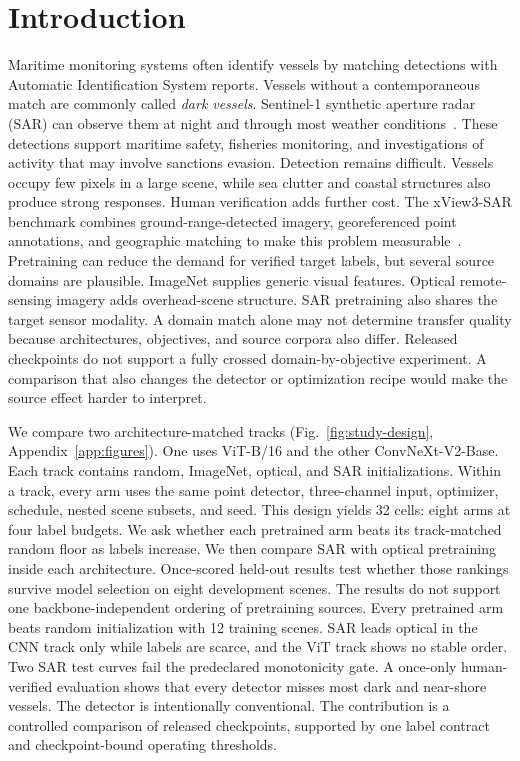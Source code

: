 \section{Introduction}

Maritime monitoring systems often identify vessels by matching detections
with Automatic Identification System reports. Vessels without a
contemporaneous match are commonly called \emph{dark vessels}. Sentinel-1
synthetic aperture radar (SAR) can observe them at night and through most
weather conditions~\cite{torres2012sentinel1}. These detections support
maritime safety, fisheries monitoring, and investigations of activity that
may involve sanctions evasion. Detection remains difficult. Vessels occupy
few pixels in a large scene, while sea clutter and coastal structures also
produce strong responses. Human verification adds further cost. The
xView3-SAR benchmark combines ground-range-detected imagery, georeferenced
point annotations, and geographic matching to make this problem
measurable~\cite{paolo2022xview3}.
Pretraining can reduce the demand for verified target labels, but several
source domains are plausible. ImageNet supplies generic visual features.
Optical remote-sensing imagery adds overhead-scene structure. SAR pretraining
also shares the target sensor modality. A domain match alone may not
determine transfer quality because architectures, objectives, and source
corpora also differ. Released checkpoints do not support a fully crossed
domain-by-objective experiment. A comparison that also changes the detector
or optimization recipe would make the source effect harder to interpret.

We compare two architecture-matched tracks
(Fig.~\ref{fig:study-design}, Appendix~\ref{app:figures}). One uses ViT-B/16
and the other ConvNeXt-V2-Base. Each track contains random, ImageNet,
optical, and SAR initializations. Within a track, every arm uses the same
point detector,
three-channel input, optimizer, schedule, nested scene subsets, and seed.
This design yields 32 cells: eight arms at four label budgets. We ask whether
each pretrained arm beats its track-matched random floor as labels increase.
We then compare SAR with optical pretraining inside each architecture.
Once-scored held-out results test whether those rankings survive model
selection on eight development scenes.
The results do not support one backbone-independent ordering of pretraining
sources. Every pretrained arm beats random initialization with 12 training
scenes. SAR leads optical in the CNN track only while labels are scarce, and
the ViT track shows no stable order.\ifHevTestComplete{} Two SAR test curves
fail the predeclared monotonicity gate.\fi\ifHevFinalEval{} A once-only
human-verified evaluation shows that every detector misses most dark and
near-shore vessels.\fi{} The detector is intentionally conventional. The
contribution is a controlled comparison of released checkpoints, supported
by one label contract and checkpoint-bound operating thresholds.
